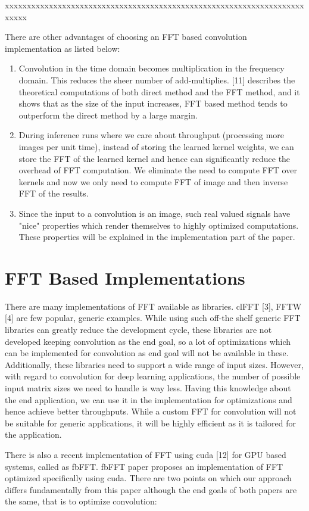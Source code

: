 \documentclass[sigconf]{acmart}
\begin{document}
xxxxxxxxxxxxxxxxxxxxxxxxxxxxxxxxxxxxxxxxxxxxxxxxxxxxxxxxxxxxxxxxxxxxxxxxx

There are other advantages of choosing an FFT based convolution implementation as listed below:
\begin{enumerate}
\item Convolution in the time domain becomes multiplication in the frequency domain. This reduces the sheer number of add-multiplies. [11] describes the theoretical computations of both direct method and the FFT method, and it shows that as the size of the input increases, FFT based method tends to outperform the direct method by a large margin.
\item During inference runs where we care about throughput (processing more images per unit time), instead of storing the learned kernel weights, we can store the FFT of the learned kernel and hence can significantly reduce the overhead of FFT computation. We eliminate the need to compute FFT over kernels and now we only need to compute FFT of image and then inverse FFT of the results.
\item Since the input to a convolution is an image, such real valued signals have "nice" properties which render themselves to highly optimized computations. These properties will be explained in the implementation part of the paper.
\end{enumerate}

\section{FFT Based Implementations}
There are many implementations of FFT available as libraries. clFFT [3], FFTW [4] are few popular, generic examples. While using such off-the shelf generic FFT libraries can greatly reduce the development cycle, these libraries are not developed keeping convolution as the end goal,  so a lot of optimizations which can be implemented for convolution as end goal will not be available in these. Additionally, these libraries need to support a wide range of input sizes. However, with regard to convolution for deep learning applications, the number of possible input matrix sizes we need to handle is way less. Having this knowledge about the end application, we can use it in the implementation for optimizations and hence achieve better throughputs. While a custom FFT for convolution will not be suitable for generic applications, it will be highly efficient as it is tailored for the application.

There is also a recent implementation of FFT using cuda [12] for GPU based systems, called as fbFFT. fbFFT paper proposes an implementation of FFT optimized specifically using cuda. There are two points on which our approach differs fundamentally from this paper although the end goals of both papers are the same, that is to optimize convolution:
\end{document}
